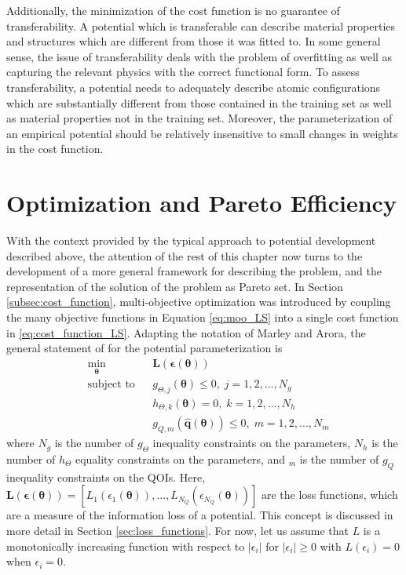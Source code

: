 Additionally, the minimization of the cost function is no guarantee of transferability.  A potential which is transferable can describe material properties and structures which are different from those it was fitted to.  In some general sense, the issue of transferability deals with the problem of overfitting as well as capturing the relevant physics with the correct functional form.  To assess transferability, a potential needs to adequately describe atomic configurations which are substantially different from those contained in the training set as well as material properties not in the training set.  Moreover, the parameterization of an empirical potential should be relatively insensitive to small changes in weights in the cost function\cite{martinez2013_fitting}.

\section{Optimization and Pareto Efficiency}

With the context provided by the typical approach to potential development described above, the attention of the rest of this chapter now turns to the development of a more general framework for describing the problem, and the representation of the solution of the problem as Pareto set.  In Section \ref{subsec:cost_function}, multi-objective optimization was introduced by coupling the many objective functions in Equation \ref{eq:moo_LS} into a single cost function in \ref{eq:cost_function_LS}.  Adapting the notation of Marley and Arora\cite{marler2004_moo_survey}, the general statement of for the potential parameterization is
\begin{subequations}
	\label{eq:moo}
\begin{align}
  	&\min_{\bm{\theta}}
	    & & \bm{L}(\bm{\epsilon}(\bm{\theta})) \\
    &\text{subject to}
	    & & g_{\Theta,j}(\bm{\theta}) \leq 0,
			    \; j=1,2,...,N_g \\
	  & & & h_{\Theta,k}(\bm{\theta}) = 0,
		      \; k=1,2,...,N_h \\
	  & & & g_{Q,m}(\hat{\bm{q}}(\bm{\theta})) \leq 0,
		      \; m=1,2,...,N_m
\end{align}
\end{subequations}
where
$N_g$ is the number of $g_\Theta$ inequality constraints on the parameters,
$N_h$ is the number of $h_\Theta$ equality constraints on the parameters,
and $_m$ is the number of $g_Q$ inequality constraints on the QOIs.
Here,
$
\bm{L}(\bm{\epsilon}(\bm{\theta}))
=
[
  L_1(\epsilon_1(\bm{\theta})),
	...,
	L_{N_Q}(\epsilon_{N_Q}(\bm{\theta}))
]
$ are the loss functions, which are a measure of the information loss of a potential.  This concept is discussed in more detail in Section \ref{sec:loss_functions}.  For now, let us assume that $L$ is a monotonically increasing function with respect to $|\epsilon_i|$ for $|\epsilon_i| \geq 0$ with $L(\epsilon_i)=0$ when $\epsilon_i=0$.

